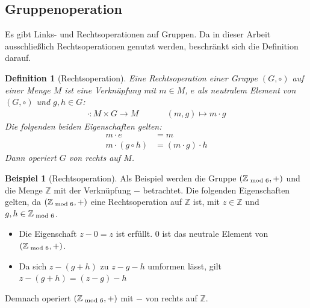 \documentclass[12pt,a4paper, usenames, dvipsnames]{article}
\theoremstyle{mystyle}
\newtheorem{definition}{Definition}
\theoremstyle{definition}
\newtheorem{bsp}{Beispiel}[definition]
\begin{document}
%
%
%
%
%
%
%
%
%
%

\subsection{Gruppenoperation}
 \label{Abschnitt_Gruppenoperation}



Es gibt Links- und Rechtsoperationen auf Gruppen. Da in dieser Arbeit ausschließlich Rechtsoperationen genutzt werden, beschränkt sich die Definition darauf.


\begin{definition}[Rechtsoperation]

Eine Rechtsoperation einer Gruppe $(G, \circ)$ auf einer Menge $M$ ist eine Verknüpfung mit $m \in M$, $e$ als neutralem Element von $(G,\circ)$ und $g,h \in G$:
\begin{align*}
\cdot: M \times G \rightarrow M \ \ \ \ \ \ \ \ \ \ \ \ \ \ \
(m, g) \mapsto m \cdot g 
\end{align*}
Die folgenden beiden Eigenschaften gelten:
\begin{align*}
m \cdot e & = m \\
m \cdot (g \circ h) & = (m \cdot g) \cdot h
\end{align*}
Dann operiert $G$ von rechts auf $M$.

\end{definition}


\begin{bsp}[Rechtsoperation]

Als Beispiel werden die Gruppe $(\mathbb{Z}_{\hspace*{-0.3em}\mod 6}, +)$ und die Menge $\mathbb{Z}$ mit der Verknüpfung $-$ betrachtet. Die folgenden Eigenschaften gelten, da $(\mathbb{Z}_{\hspace*{-0.3em}\mod 6}, +)$ eine Rechtsoperation auf $\mathbb{Z}$ ist, mit $z \in  \mathbb{Z}$ und $g,h \in \mathbb{Z}_{\hspace*{-0.3em}\mod 6}$.
\begin{itemize}
\item Die Eigenschaft $z - 0 = z$ ist erfüllt. $0$ ist das neutrale Element von $(\mathbb{Z}_{\hspace*{-0.3em}\mod 6}, +)$.
\item Da sich $z-(g+h)$ zu $z-g-h$ umformen lässt, gilt $z-(g+h) = (z-g)-h$
\end{itemize}
Demnach operiert $(\mathbb{Z}_{\hspace*{-0.3em}\mod 6}, +)$ mit $-$ von rechts auf $\mathbb{Z}$.

\end{bsp}
\end{document}
